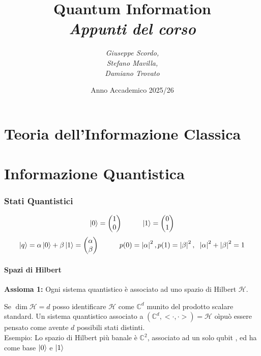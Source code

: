 \documentclass{report}
\title{\textbf{\Huge Quantum Information}\\ {\Large \textbf{\textit{Appunti del corso}}}}
\author{\textit{Giuseppe Scordo,} \\ \textit{Stefano Mavilla,} \\ \textit{Damiano Trovato}}
\date{Anno Accademico 2025/26}
\begin{document}
\maketitle
\tableofcontents


\part{Teoria dell'Informazione Classica}









\part{Informazione Quantistica}


\section{Stati Quantistici}
$$\ket{0} = 
\begin{pmatrix}
    1 \\
    0 \\
\end{pmatrix}
\hspace{1cm}
\ket{1} = 
\begin{pmatrix}
    0 \\
    1 \\
\end{pmatrix}
$$
$$\ket{q} = \alpha\ket{0}+\beta\ket{1}=
\begin{pmatrix}
    \alpha \\
    \beta \\
\end{pmatrix}
\hspace{1cm} p(0)= \left|\alpha \right|^2, p(1)= \left|\beta \right|^2,\hspace{0.2cm} \left|\alpha \right|^2 +\left|\beta \right|^2 = 1
$$
\subsection{Spazi di Hilbert}
\textbf{Assioma 1:} Ogni sistema quantistico è associato ad uno spazio di Hilbert $\mathcal{H}$.

Se $\dim \mathcal{H} = d$ posso identificare $\mathcal{H}$ come $\mathbb{C}^d$ munito del prodotto scalare standard.
Un sistema quantistico associato a $\left(\mathbb{C}^d,<\cdot,\cdot> \right)= \mathcal{H}$ oìpuò essere pensato come avente $d$ possibili stati distinti.
\\Esempio: Lo spazio di Hilbert più banale è $\mathbb{C}^2$, associato ad un solo qubit , ed ha come base $\ket{0}$ e $\ket{1}$
\end{document}
